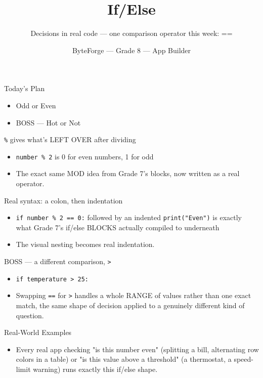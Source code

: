 \documentclass[aspectratio=169]{beamer}
\title{If/Else}
\subtitle{Decisions in real code — one comparison operator this week: ==}
\author{ByteForge --- Grade 8 --- App Builder}
\date{}
\begin{document}
\begin{frame}
    \titlepage
\end{frame}

\begin{frame}{Today's Plan}
    \begin{itemize}
        \item Odd or Even
        \item[$\bigstar$] BOSS --- Hot or Not
    \end{itemize}
\end{frame}

\begin{frame}{\texttt{\%} gives what's LEFT OVER after dividing}
    \large
    \begin{itemize}
        \item \texttt{number \% 2} is 0 for even numbers, 1 for odd
        \item The exact same MOD idea from Grade 7's blocks, now written as a real operator.
    \end{itemize}
\end{frame}


\begin{frame}{Real syntax: a colon, then indentation}
    \large
    \begin{itemize}
        \item \texttt{if number \% 2 == 0:} followed by an indented \texttt{print("Even")} is exactly what Grade 7's if/else BLOCKS actually compiled to underneath
        \item The visual nesting becomes real indentation.
    \end{itemize}
\end{frame}


\begin{frame}{BOSS — a different comparison, \texttt{>}}
    \large
    \begin{itemize}
        \item \texttt{if temperature > 25:}
        \item Swapping \texttt{==} for \texttt{>} handles a whole RANGE of values rather than one exact match, the same shape of decision applied to a genuinely different kind of question.
    \end{itemize}
\end{frame}

\begin{frame}{Real-World Examples}
    \large
    \begin{itemize}
        \item Every real app checking "is this number even" (splitting a bill, alternating row colors in a table) or "is this value above a threshold" (a thermostat, a speed-limit warning) runs exactly this if/else shape.
    \end{itemize}
\end{frame}
\end{document}
